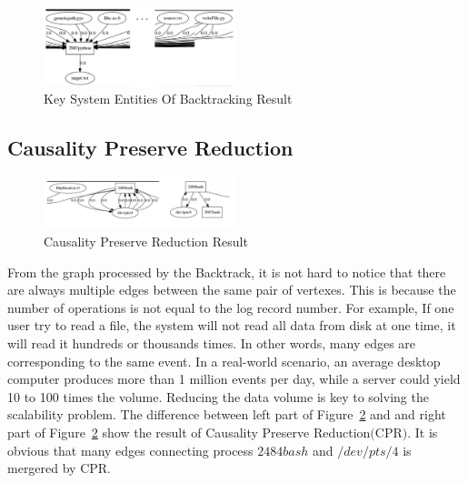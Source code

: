 \begin{figure}[!htb]
	\centering
	\includegraphics[width=0.5\textwidth]{simpleBack.png}
	\caption{Key System Entities Of Backtracking Result}
	\label{fig:simpleBack}
\end{figure}
\subsection{Causality Preserve Reduction}
\begin{figure}[!htb]
	\centering
	\includegraphics[width=0.5\textwidth]{simpleCPR.png}
	\caption{Causality Preserve Reduction Result}
	\label{fig:simpleCPR}
\end{figure}
From the graph processed by the Backtrack, it is not hard to notice that there are always multiple edges between the same pair of vertexes. This is because the number of operations is not equal to the log record number. For example, If one user try to read a file, the system will not read all data from disk at one time, it will read it hundreds or thousands times. In other words, many edges are corresponding to the same event. In a real-world scenario, an average desktop computer produces more than 1 million events per day, while a server could yield 10 to 100 times the volume. 
Reducing the data volume is key to solving the scalability problem. The difference between left part of Figure~\ref{fig:simpleCPR} and and right part of Figure~\ref{fig:simpleCPR} show the result of Causality Preserve Reduction$($CPR$)$. It is obvious that many edges connecting  process $2484bash$ and $/dev/pts/4$ is mergered by CPR.



